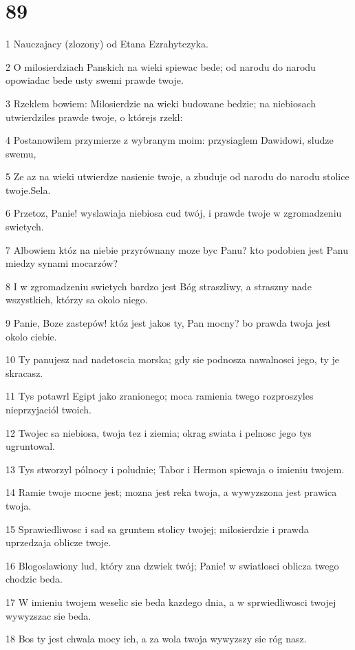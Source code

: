 \chapter{89}

\par 1 Nauczajacy (zlozony) od Etana Ezrahytczyka.
\par 2 O milosierdziach Panskich na wieki spiewac bede; od narodu do narodu opowiadac bede usty swemi prawde twoje.
\par 3 Rzeklem bowiem: Milosierdzie na wieki budowane bedzie; na niebiosach utwierdziles prawde twoje, o którejs rzekl:
\par 4 Postanowilem przymierze z wybranym moim: przysiaglem Dawidowi, sludze swemu,
\par 5 Ze az na wieki utwierdze nasienie twoje, a zbuduje od narodu do narodu stolice twoje.Sela.
\par 6 Przetoz, Panie! wyslawiaja niebiosa cud twój, i prawde twoje w zgromadzeniu swietych.
\par 7 Albowiem któz na niebie przyrównany moze byc Panu? kto podobien jest Panu miedzy synami mocarzów?
\par 8 I w zgromadzeniu swietych bardzo jest Bóg straszliwy, a straszny nade wszystkich, którzy sa okolo niego.
\par 9 Panie, Boze zastepów! któz jest jakos ty, Pan mocny? bo prawda twoja jest okolo ciebie.
\par 10 Ty panujesz nad nadetoscia morska; gdy sie podnosza nawalnosci jego, ty je skracasz.
\par 11 Tys potawrl Egipt jako zranionego; moca ramienia twego rozproszyles nieprzyjaciól twoich.
\par 12 Twojec sa niebiosa, twoja tez i ziemia; okrag swiata i pelnosc jego tys ugruntowal.
\par 13 Tys stworzyl pólnocy i poludnie; Tabor i Hermon spiewaja o imieniu twojem.
\par 14 Ramie twoje mocne jest; mozna jest reka twoja, a wywyzszona jest prawica twoja.
\par 15 Sprawiedliwosc i sad sa gruntem stolicy twojej; milosierdzie i prawda uprzedzaja oblicze twoje.
\par 16 Blogoslawiony lud, który zna dzwiek twój; Panie! w swiatlosci oblicza twego chodzic beda.
\par 17 W imieniu twojem weselic sie beda kazdego dnia, a w sprwiedliwosci twojej wywyzszac sie beda.
\par 18 Bos ty jest chwala mocy ich, a za wola twoja wywyzszy sie róg nasz.

